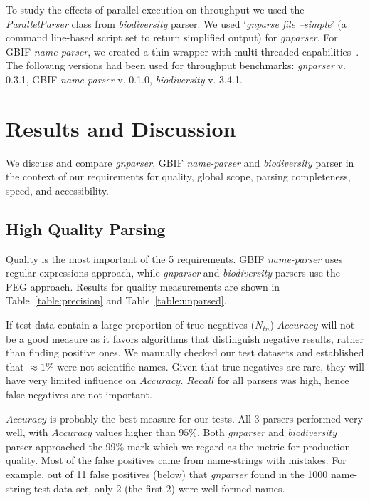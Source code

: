 \documentclass{bmcart}
\begin{document}
To study the effects of parallel execution on throughput we used the \textit{ParallelParser} class from \textit{biodiversity} parser. We used `\textit{gnparse file --simple}' (a command line-based script set to return simplified output) for \textit{gnparser}. For GBIF \textit{name-parser}, we created a thin wrapper with multi-threaded capabilities~\cite{gbifparser}. The following versions had been used for throughput benchmarks: \textit{gnparser} v. 0.3.1, GBIF \textit{name-parser} v.  0.1.0, \textit{biodiversity} v. 3.4.1.


\section*{Results and Discussion}\label{sec:discussion}

We discuss and compare \textit{gnparser}, GBIF \textit{name-parser} and \textit{biodiversity} parser in the context of our requirements for quality, global scope, parsing completeness, speed, and accessibility.


\subsection*{High Quality Parsing}

Quality is the most important of the 5 requirements. GBIF \textit{name-parser} uses regular expressions approach, while \textit{gnparser} and \textit{biodiversity} parsers use the PEG approach. Results for quality measurements are shown in Table~\ref{table:precision} and Table~\ref{table:unparsed}.

If test data contain a large proportion of true negatives ($N_{tn}$) $Accuracy$ will not be a good measure as it favors algorithms that distinguish negative results, rather than finding positive ones. We manually checked our test datasets and established that $\approx1\%$ were not scientific names. Given that true negatives are rare, they will have very limited influence on $Accuracy$. $Recall$ for all parsers was high, hence false negatives are not important.

$Accuracy$ is probably the best measure for our tests. All 3 parsers performed very well, with $Accuracy$ values higher than $95\%$. Both \textit{gnparser} and \textit{biodiversity} parser approached the 99\% mark which we regard as the metric for production quality. Most of the false positives came from name-strings with mistakes. For example, out of 11 false positives (below) that \textit{gnparser} found in the 1000 name-string test data set, only 2 (the first 2) were well-formed names.
\end{document}
